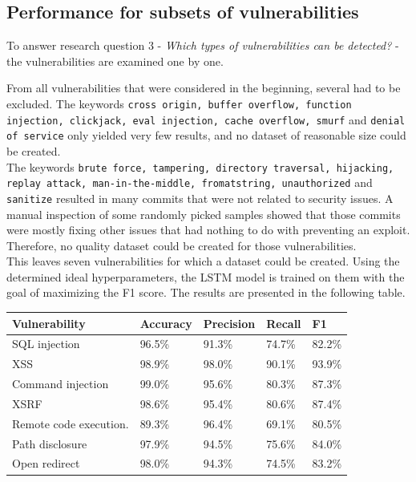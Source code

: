 \documentclass[
a4paper,
pagesize,
pdftex,
12pt,
twoside, %
BCOR=5mm, %
ngerman,
fleqn,
final,
]{scrartcl}
\begin{document}
	
	
	\subsection{Performance for subsets of vulnerabilities}
	
	To answer research question 3 - \textit{Which types of vulnerabilities can be detected?} - the vulnerabilities are examined one by one.
	
	From all vulnerabilities that were considered in the beginning, several had to be excluded. The keywords \texttt{cross origin, buffer overflow, function injection, clickjack, eval injection, cache overflow, smurf} and \texttt{denial of service} only yielded very few results, and no dataset of reasonable size could be created.\\
	The keywords \texttt{brute force, tampering, directory traversal, hijacking, replay attack, man-in-the-middle, fromatstring, unauthorized} and \texttt{sanitize} resulted in many commits that were not related to security issues. A manual inspection of some randomly picked samples showed that those commits were mostly fixing other issues that had nothing to do with preventing an exploit. Therefore, no quality dataset could be created for those vulnerabilities.\\
	This leaves seven vulnerabilities for which a dataset could be created. Using the determined ideal hyperparameters, the LSTM model is trained on them with the goal of maximizing the F1 score. The results are presented in the following table. 
	
	\begin{tabular}{ | p{5cm} || p{2cm}|p{2cm}|p{2cm}|p{2cm}|  }
		\hline
		\textbf{Vulnerability} & \textbf{Accuracy} & \textbf{Precision} & \textbf{Recall} & \textbf{F1} \\
		\hline
		SQL injection & 96.5\% & 91.3\% & 74.7\% & 82.2\% \\
		XSS & 98.9\% & 98.0\% & 90.1\% & 93.9\% \\
		Command injection & 99.0\%  & 95.6\% & 80.3\% & 87.3\%  \\
		XSRF & 98.6\% & 95.4\% & 80.6\% & 87.4\% \\
		Remote code execution.  & 89.3\% & 96.4\% & 69.1\% & 80.5\%\\
		Path disclosure & 97.9\% & 94.5\% & 75.6\% & 84.0\% \\
		Open redirect & 98.0\% & 94.3\% & 74.5\% & 83.2\%  \\
		\hline
		\hline
	\end{tabular}
	
\end{document}
